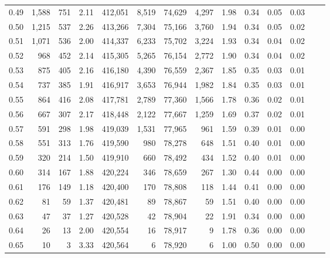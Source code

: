 \begin{tabular}{rrrrrrrrrrrrrr}
0.49 &   1,588 &    751 &    2.11 &  412,051 &    8,519 &  74,629 &   4,297 &  1.98 &  0.34 &  0.05 &      0.03 \\
0.50 &   1,215 &    537 &    2.26 &  413,266 &    7,304 &  75,166 &   3,760 &  1.94 &  0.34 &  0.05 &      0.02 \\
0.51 &   1,071 &    536 &    2.00 &  414,337 &    6,233 &  75,702 &   3,224 &  1.93 &  0.34 &  0.04 &      0.02 \\
0.52 &     968 &    452 &    2.14 &  415,305 &    5,265 &  76,154 &   2,772 &  1.90 &  0.34 &  0.04 &      0.02 \\
0.53 &     875 &    405 &    2.16 &  416,180 &    4,390 &  76,559 &   2,367 &  1.85 &  0.35 &  0.03 &      0.01 \\
0.54 &     737 &    385 &    1.91 &  416,917 &    3,653 &  76,944 &   1,982 &  1.84 &  0.35 &  0.03 &      0.01 \\
0.55 &     864 &    416 &    2.08 &  417,781 &    2,789 &  77,360 &   1,566 &  1.78 &  0.36 &  0.02 &      0.01 \\
0.56 &     667 &    307 &    2.17 &  418,448 &    2,122 &  77,667 &   1,259 &  1.69 &  0.37 &  0.02 &      0.01 \\
0.57 &     591 &    298 &    1.98 &  419,039 &    1,531 &  77,965 &     961 &  1.59 &  0.39 &  0.01 &      0.00 \\
0.58 &     551 &    313 &    1.76 &  419,590 &      980 &  78,278 &     648 &  1.51 &  0.40 &  0.01 &      0.00 \\
0.59 &     320 &    214 &    1.50 &  419,910 &      660 &  78,492 &     434 &  1.52 &  0.40 &  0.01 &      0.00 \\
0.60 &     314 &    167 &    1.88 &  420,224 &      346 &  78,659 &     267 &  1.30 &  0.44 &  0.00 &      0.00 \\
0.61 &     176 &    149 &    1.18 &  420,400 &      170 &  78,808 &     118 &  1.44 &  0.41 &  0.00 &      0.00 \\
0.62 &      81 &     59 &    1.37 &  420,481 &       89 &  78,867 &      59 &  1.51 &  0.40 &  0.00 &      0.00 \\
0.63 &      47 &     37 &    1.27 &  420,528 &       42 &  78,904 &      22 &  1.91 &  0.34 &  0.00 &      0.00 \\
0.64 &      26 &     13 &    2.00 &  420,554 &       16 &  78,917 &       9 &  1.78 &  0.36 &  0.00 &      0.00 \\
0.65 &      10 &      3 &    3.33 &  420,564 &        6 &  78,920 &       6 &  1.00 &  0.50 &  0.00 &      0.00 \\

\end{tabular}
